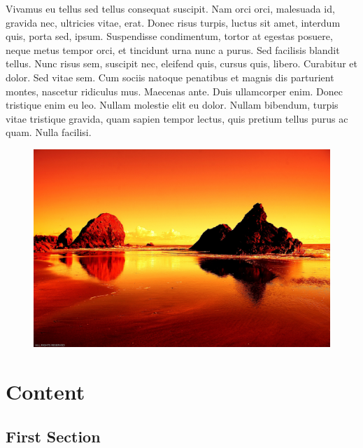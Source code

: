 \documentclass[portable]{yReport}
\begin{document}
\lipsum[3]


Vivamus eu tellus sed tellus consequat suscipit. Nam orci orci, malesuada
id, gravida nec, ultricies vitae, erat. Donec risus turpis, luctus sit amet, interdum quis, porta sed, ipsum. Suspendisse condimentum, tortor at egestas
posuere, neque metus tempor orci, et tincidunt urna nunc a purus. Sed
facilisis blandit tellus. Nunc risus sem, suscipit nec, eleifend quis, cursus
quis, libero. Curabitur et dolor. Sed vitae sem\sideNote{\lipsum[27]}. Cum sociis natoque penatibus et magnis dis parturient montes, nascetur ridiculus mus. Maecenas
ante. Duis ullamcorper enim. Donec tristique enim eu leo. Nullam molestie
elit eu dolor. Nullam bibendum, turpis vitae tristique gravida, quam sapien
tempor lectus, quis pretium tellus purus ac quam. Nulla facilisi.

\lipsum[26]

\begin{figure}[ht!]
  \includegraphics[width=\linewidth]{images/sunset.jpg}
\end{figure}



\chapter{Content}

\lipsum[2]
\lipsum[3]

\section{First Section}
\end{document}
